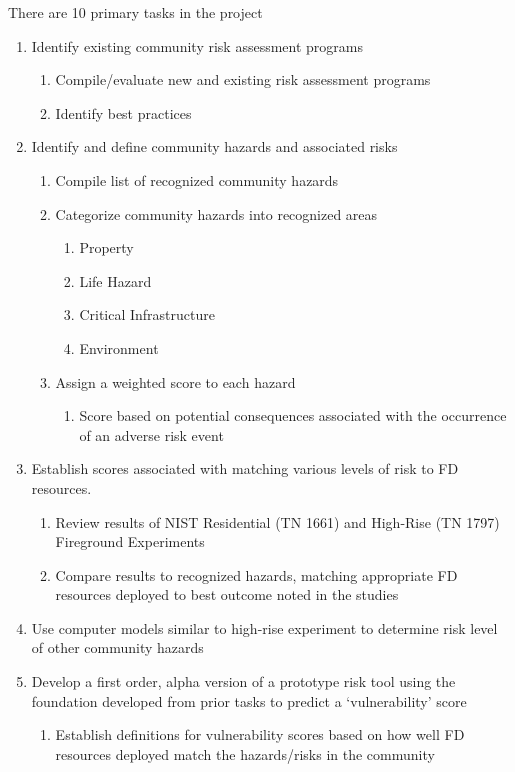\documentclass[12pt,letterpaper]{article}
\begin{document}
There are 10 primary tasks in the project
\begin{enumerate}
	\item Identify existing community risk assessment programs
	\begin{enumerate}
		\item Compile/evaluate new and existing risk assessment programs 
		\item Identify best practices
	\end{enumerate}
	\item Identify and define community hazards and associated risks
	\begin{enumerate}
		\item Compile list of recognized community hazards
		\item Categorize community hazards into recognized areas
			\begin{enumerate}
				\item Property
				\item Life Hazard
				\item Critical Infrastructure
				\item Environment
			\end{enumerate}
		\item Assign a weighted score to each hazard
			\begin{enumerate}
				\item Score based on potential consequences associated with the occurrence of an adverse risk event
			\end{enumerate}
	\end{enumerate}
	\item Establish scores associated with matching various levels of risk to FD resources.
	\begin{enumerate}
		\item Review results of NIST Residential (TN 1661) and High-Rise (TN 1797) Fireground Experiments
		\item Compare results to recognized hazards, matching appropriate FD resources deployed to best outcome noted in the studies
	\end{enumerate}
	\item Use computer models similar to high-rise experiment to determine risk level of other community hazards
	\item Develop a first order, alpha version of a prototype risk tool using the foundation developed from prior tasks to predict a `vulnerability' score
	\begin{enumerate}
		\item Establish definitions for vulnerability scores based on how well FD resources deployed match the hazards/risks in the community

\end{enumerate}
\end{enumerate}
\end{document}
